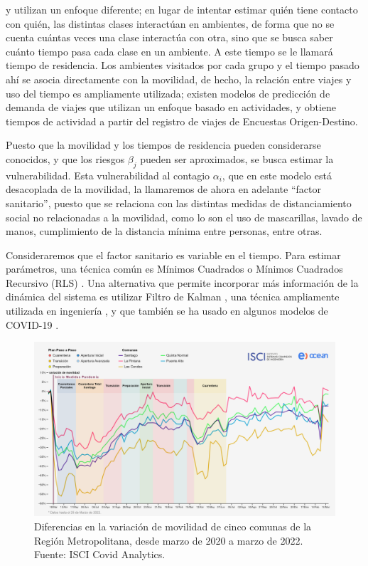 \begin{intro}
\cite{Bichara2015} y \cite{Bichara2018} utilizan un enfoque diferente; en lugar de intentar estimar quién tiene contacto con quién, las distintas clases interactúan en ambientes, de forma que no se cuenta cuántas veces una clase interactúa con otra, sino que se busca saber cuánto tiempo pasa cada clase en un ambiente. A este tiempo se le llamará tiempo de residencia. Los ambientes visitados por cada grupo y el tiempo pasado ahí se asocia directamente con la movilidad, de hecho, la relación entre viajes y uso del tiempo es ampliamente utilizada; existen modelos \cite{Kitamura1988}\cite{Axhausen1992} de predicción de demanda de viajes que utilizan un enfoque basado en actividades, y \cite{Munizaga2011} obtiene tiempos de actividad a partir del registro de viajes de Encuestas Origen-Destino.

Puesto que la movilidad y los tiempos de residencia pueden considerarse conocidos, y que los riesgos \(\beta_j\) pueden ser aproximados, se busca estimar la vulnerabilidad. Esta vulnerabilidad al contagio \(\alpha_i\), que en este modelo está desacoplada de la movilidad, la llamaremos de ahora en adelante ``factor sanitario'', puesto que se relaciona con las distintas medidas de distanciamiento social no relacionadas a la movilidad, como lo son el uso de mascarillas, lavado de manos, cumplimiento de la distancia mínima entre personas, entre otras.

Consideraremos que el factor sanitario es variable en el tiempo. Para estimar parámetros, una técnica común es Mínimos Cuadrados o Mínimos Cuadrados Recursivo (RLS) \cite{Sameni2020}\cite{Piccolomini2020}. Una alternativa que permite incorporar más información de la dinámica del sistema es utilizar Filtro de Kalman \cite{Kalman1960}, una técnica ampliamente utilizada en ingeniería \cite{Auger2013}, y que también se ha usado en algunos modelos de COVID-19 \cite{Hasan2020}\cite{Song2021}\cite{Sameni2020}.

\begin{figure}[h]
\centering
\includegraphics[width=\textwidth]{img/metodologia/datos/movilidad-RM.png}
\caption[Diferencias en la variación de movilidad de cinco comunas de la Región Metropolitana.]{Diferencias en la variación de movilidad de cinco comunas de la Región Metropolitana, desde marzo de 2020 a marzo de 2022. Fuente: ISCI Covid Analytics.}
\label{img:ISCI-movilidad-RM-1}
\end{figure}


\end{intro}
